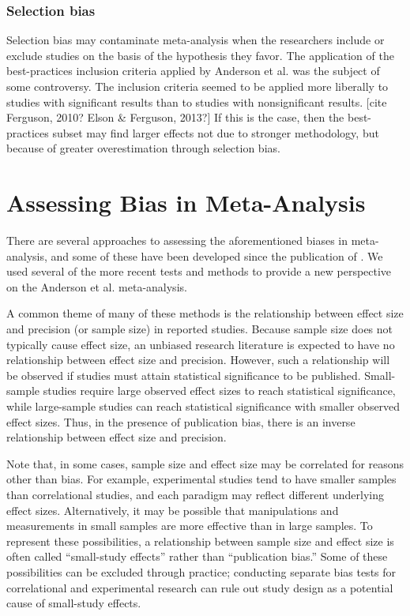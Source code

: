 \documentclass[man]{apa6}
\begin{document}
\subsubsection{Selection bias}
Selection bias may contaminate meta-analysis when the researchers include or exclude studies on the basis of the hypothesis they favor. The application of the best-practices inclusion criteria applied by Anderson et al. was the subject of some controversy. The inclusion criteria seemed to be applied more liberally to studies with significant results than to studies with nonsignificant results. [cite Ferguson, 2010? Elson \& Ferguson, 2013?] If this is the case, then the best-practices subset may find larger effects not due to stronger methodology, but because of greater overestimation through selection bias. 

\section{Assessing Bias in Meta-Analysis}
There are several approaches to assessing the aforementioned biases in meta-analysis, and some of these have been developed since the publication of \citet{Anderson:etal:2010}. We used several of the more recent tests and methods to provide a new perspective on the Anderson et al. meta-analysis.

A common theme of many of these methods is the relationship between effect size and precision (or sample size) in reported studies. Because sample size does not typically cause effect size, an unbiased research literature is expected to have no relationship between effect size and precision. However, such a relationship will be observed if studies must attain statistical significance to be published. Small-sample studies require large observed effect sizes to reach statistical significance, while large-sample studies can reach statistical significance with smaller observed effect sizes. Thus, in the presence of publication bias, there is an inverse relationship between effect size and precision. 

Note that, in some cases, sample size and effect size may be correlated for reasons other than bias. For example, experimental studies tend to have smaller samples than correlational studies, and each paradigm may reflect different underlying effect sizes. Alternatively, it may be possible that manipulations and measurements in small samples are more effective than in large samples. To represent these possibilities, a relationship between sample size and effect size is often called ``small-study effects'' rather than ``publication bias.'' Some of these possibilities can be excluded through practice; conducting separate bias tests for correlational and experimental research can rule out study design as a potential cause of small-study effects.
\end{document}

